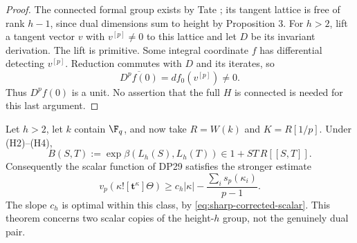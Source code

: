 \begin{proof}
The connected formal group exists by Tate \cite[\S2.2, Proposition 1, p.~162 and (4), p.~164]{Tate67}; its tangent lattice is free of rank $h-1$, since dual dimensions sum to height by Proposition 3. For $h>2$, lift a tangent vector $v$ with $v^{[p]}\ne0$ to this lattice and let $D$ be its invariant derivation. The lift is primitive. Some integral coordinate $f$ has differential detecting $v^{[p]}$. Reduction commutes with $D$ and its iterates, so
\[
 \overline{D^pf(0)}=df_0(v^{[p]})\ne0.
\]
Thus $D^pf(0)$ is a unit. No assertion that the full $H$ is connected is needed for this last argument.
\end{proof}

\begin{theorem}\label{DP31}
Let $h>2$, let $k$ contain $\F_q$, and now take $R=W(k)$ and $K=R[1/p]$. Under (H2)--(H4),
\begin{equation}\label{eq:scalar-gauge}
 B(S,T):=\exp\beta(L_h(S),L_h(T))\in1+ST\,R[[S,T]].
\end{equation}
Consequently the scalar function of DP29 satisfies the stronger estimate
\begin{equation}\label{eq:scalar-full-slope}
 v_p(\kappa![\mathbf t^\kappa]\Theta)
 \ge c_h|\kappa|-\frac{\sum_i s_p(\kappa_i)}{p-1}.
\end{equation}
The slope $c_h$ is optimal within this class, by \eqref{eq:sharp-corrected-scalar}. This theorem concerns two scalar copies of the height-$h$ group, not the genuinely dual pair.
\end{theorem}
